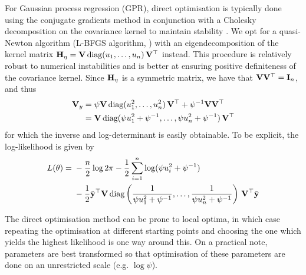 For Gaussian process regression (GPR), direct optimisation is typically done using the conjugate gradients method in conjunction with a Cholesky decomposition on the covariance kernel to maintain stability \citep{rasmussen2006gaussian}. 
We opt for a quasi-Newton algorithm (L-BFGS algorithm, \cite{nocedal2006numerical})  with an eigendecomposition of the kernel matrix $\bH_{\eta} = \bV \, \text{diag}(u_1,\dots,u_n) \, \bV^\top$ instead.
This procedure is relatively robust to numerical instabilities and is better at ensuring positive definiteness of the covariance kernel.
Since $\bH_{\eta}$ is a symmetric matrix, we have that $\bV\bV^\top = \bI_n$, and thus
\begingroup
\setlength{\abovedisplayskip}{6pt}
\setlength{\belowdisplayskip}{8pt}
\begin{align*}
  \bV_y 
  &= \psi\bV \, \text{diag}(u_1^2,\dots,u_n^2) \, \bV^\top + \psi^{-1} \bV\bV^\top \\
  &= \bV \, \text{diag} (\psi u_1^2 + \psi^{-1},\dots,\psi u_n^2 + \psi^{-1}) \, \bV^\top 
\end{align*}
\endgroup
for which the inverse and log-determinant is easily obtainable.
To be explicit, the log-likelihood is given by
\begingroup
\setlength{\abovedisplayskip}{8pt}
\setlength{\belowdisplayskip}{6pt}
  \begin{align}
    \begin{split}
      L(\theta) 
      ={}& -\half[n]\log 2\pi - \half\sum_{i=1}^n\log(\psi u_i^2 + \psi^{-1}) \\
      &- \half \tilde\by^\top \bV \, \text{diag} \left(\frac{1}{\psi u_1^2 + \psi^{-1}},\dots,\frac{1}{\psi u_n^2 + \psi^{-1}}\right) \, \bV^\top \tilde\by
    \end{split}
  \end{align}
\endgroup

The direct optimisation method can be prone to local optima, in which case repeating the optimisation at different starting points and choosing the one which yields the highest likelihood is one way around this.
On a practical note, parameters are best transformed so that optimisation of these parameters are done on an unrestricted scale (e.g. $\log \psi$).

